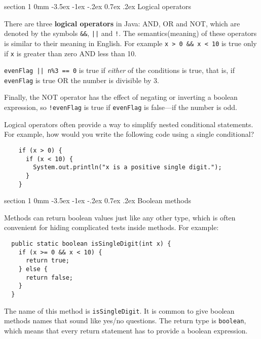 \documentclass{book}
\makeatletter
\renewcommand{\section}{\@startsection 
    {section} {1} {0mm}%
    {-3.5ex \@plus -1ex \@minus -.2ex}%
    {0.7ex \@plus.2ex}%
    {\normalfont\Large\bfseries}}
\makeatother
\begin{document}
\section{Logical operators}

There are three {\bf logical operators} in Java: AND, OR and NOT,
which are denoted by the symbols {\tt \&\&}, {\tt ||} and
{\tt !}.  The semantics(meaning) of these operators is similar
to their meaning in English.  For example {\tt x > 0 \&\& x < 10}
is true only if {\tt x} is greater than zero AND less than 10.


{\tt evenFlag || n\%3 == 0} is true if {\em either} of
the conditions is true, that is, if {\tt evenFlag} is true OR the
number is divisible by 3.

Finally, the NOT operator has the effect of negating or
inverting a boolean expression, so {\tt !evenFlag} is true
if {\tt evenFlag} is false---if the number is odd.


Logical operators often provide a way to simplify nested
conditional statements.  For example, how would you write
the following code using a single conditional?

\begin{verbatim}
    if (x > 0) {
      if (x < 10) {
        System.out.println("x is a positive single digit.");
      }
    }
\end{verbatim}

\section{Boolean methods}
\label{boolean}

Methods can return boolean values just like any other type,
which is often convenient for hiding complicated tests inside
methods.  For example:

\begin{verbatim}
  public static boolean isSingleDigit(int x) {
    if (x >= 0 && x < 10) {
      return true;
    } else {
      return false;
    }
  }
\end{verbatim}
%
The name of this method is {\tt isSingleDigit}.  It is common
to give boolean methods names that sound like yes/no questions.
The return type is {\tt boolean}, which means that every return
statement has to provide a boolean expression.
\end{document}

